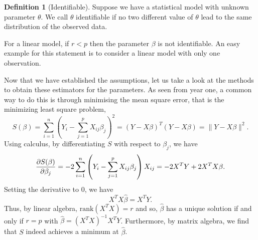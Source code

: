 \documentclass[
]{article}
\theoremstyle{definition}
\theoremstyle{definition}
\newtheorem{definition}{Definition}[section]
\begin{document}
\begin{definition}[Identifiable]
  Suppose we have a statistical model with unknown parameter \(\theta\). We call 
  \(\theta\) identifiable if no two different value of \(\theta\) lead to the 
  same distribution of the observed data.
\end{definition}

For a linear model, if \(r < p\) then the parameter \(\beta\) is not
identifiable. An easy example for this statement is to consider a linear
model with only one observation.

Now that we have established the assumptions, let us take a look at the
methods to obtain these estimators for the parameters. As seen from year
one, a common way to do this is through minimising the mean square
error, that is the minimizing least square problem,
\[S(\beta) = \sum_{i = 1}^n \left(Y_i - \sum_{j = 1}^p X_{ij} \beta_j\right)^2
  = (Y - X\beta)^T(Y - X\beta) = \|Y - X\beta\|^2.\] Using calculus, by
differentiating \(S\) with respect to \(\beta_j\), we have
\[\pdv{S(\beta)}{\beta_j} = - 2 \sum_{i = 1}^n
  \left(Y_i - \sum_{j = 1}^pX_{ij} \beta_j\right) X_{ij} = -2 X^T Y + 2 X^T X \beta.\]
Setting the derivative to 0, we have \[X^TX \hat{\beta} = X^T Y.\] Thus,
by linear algebra, \(\text{rank}(X^T X) = r\) and so, \(\hat{\beta}\)
has a unique solution if and only if \(r = p\) with
\(\hat \beta = (X^TX)^{-1} X^T Y\). Furthermore, by matrix algebra, we
find that \(S\) indeed achieves a minimum at \(\hat \beta\).
\end{document}
